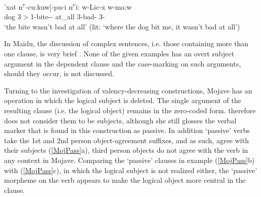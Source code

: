 \begin{exe}\ex\label{DieDep}
\gll  {\rm[}'xat n\textsuperscript{y}-cu:kuw{\rm]}-pu-i n\textsuperscript{y}i: w-Lic-x w-ma:w\\
\hspaceThis{[}dog 3$>$1-bite-\dem{}-\loc{} at\_all 3-bad-\irr{} 3-\Neg{}\\
\glt `the bite wasn't bad at all' (lit: `where the dog bit me, it wasn't bad at all') \end{exe}

In Maidu, the discussion of complex sentences, i.e. those containing more than one clause, is very brief \citep[69--70]{Shipley:1964}. 
None of the given examples has an overt subject argument in the dependent clause and the case-marking on such arguments, should they occur, is not discussed.  






Turning to the investigation of valency-decreasing constructions, Mojave has an operation in which the logical subject is deleted.  
The single argument of the resulting clause (i.e. the logical object) remains in the zero-coded form. 
\citet{Munro:1976} therefore does not consider them to be subjects, although she still glosses the verbal marker that is found in this construction as passive. 
In addition `passive' verbs take the 1st and 2nd person object-agreement suffixes, and as such, agree with their subjects (\ref{MojPass}a), third person objects do not agree with the verb in any context in Mojave.
Comparing the `passive' clauses in example (\ref{MojPass}b) with (\ref{MojPass}c), in which the logical subject is not realized either, the `passive' morpheme on the verb appears to  make the logical object more central in the clause.

